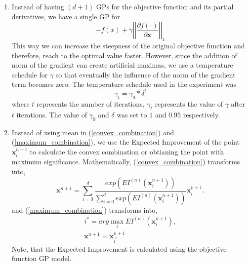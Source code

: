 \documentclass{article}
\begin{document}
\begin{enumerate}
        \item
            Instead of having $(d+1)$ GPs for the objective function and its partial derivatives, we have a single GP for 
            \begin{equation}
                -f(x) + \gamma\left | \left | \frac {\partial f(\cdot)}{\partial \textbf{x}} \right | \right|_1
            \end{equation}
            This way we can increase the steepness of the original objective function and therefore, reach to the optimal value faster. However, since the 
            addition of norm of the gradient can create artificial maximas, we use a temperature schedule for $\gamma$ so that eventually the influence of the 
            norm of the gradient term becomes zero. The temperature schedule used in the experiment was
            \begin{equation}
                \gamma_{t} = \gamma_{0}*\delta^{t}
            \end{equation}
            where $t$ represents the number of iterations, $\gamma_{t}$ represents the value of $\gamma$ after $t$ iterations. The value of $\gamma_{0}$ and 
            $\delta$ was set to $1$ and $0.95$ respectively.

        \item
            Instead of using mean in (\ref{convex_combination}) and (\ref{maximum_combination}), we use the Expected Improvement of the point 
            $\textbf{x}_{i}^{n+1}$ to calculate the convex combination or obtianing the point with maximum significance. Mathematically, 
            (\ref{convex_combination}) transforms into, 
            \begin{equation}
                \textbf {x}^{n+1} = \sum_{i=0}^{d} \frac {exp(EI^{(n)}(\textbf{x}^{n+1}_{i}))}{\sum_{i=0}^{d} exp(EI^{(n)}(\textbf{x}^{n+1}_{i}))} \textbf{x}^{n+1}_{i}.
            \end{equation}
            and (\ref{maximum_combination}) transforms into,
            \begin{equation}
            \begin{split}
                i^{*} = arg \max_{i} EI^{(n)}(\textbf{x}^{n+1}_{i}), \\
                \textbf{x}^{n+1} = \textbf{x}^{n+1}_{i^{*}}
            \end{split}
            \end{equation}
            Note, that the Expected Improvement is calculated using the objective function GP model.
    \end{enumerate}
\end{document}
